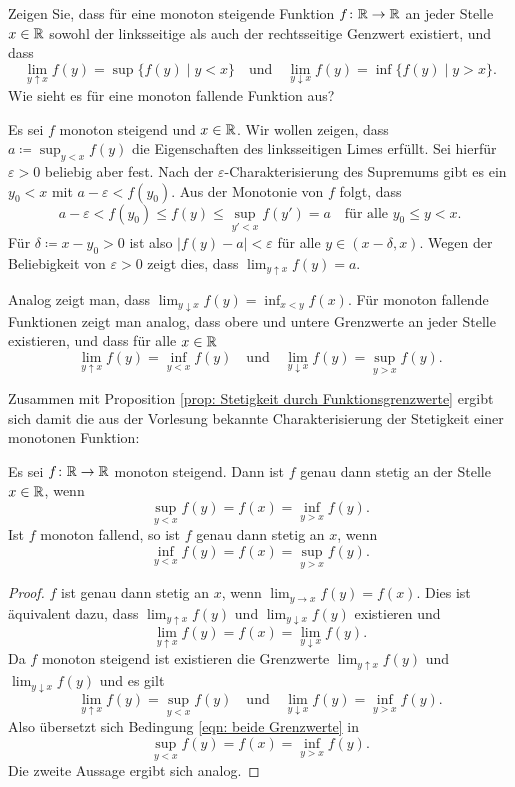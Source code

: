 \documentclass[a4paper,10pt]{article}
\begin{document}
\begin{question}
 Zeigen Sie, dass für eine monoton steigende Funktion $f \colon \mathbb{R} \to \mathbb{R}$ an jeder Stelle $x \in \mathbb{R}$ sowohl der linksseitige als auch der rechtsseitige Genzwert existiert, und dass
 \[
  \lim_{y \uparrow x} f(y) = \sup\{f(y) \mid y < x\}
  \quad
  \text{und}
  \quad
  \lim_{y \downarrow x} f(y) = \inf\{f(y) \mid y > x\}.
 \]
 Wie sieht es für eine monoton fallende Funktion aus?
\end{question}
\begin{solution}
 Es sei $f$ monoton steigend und $x \in \mathbb{R}$. Wir wollen zeigen, dass $a \coloneqq \sup_{y < x} f(y)$ die Eigenschaften des linksseitigen Limes erfüllt. Sei hierfür $\varepsilon > 0$ beliebig aber fest. Nach der $\varepsilon$-Charakterisierung des Supremums gibt es ein $y_0 < x$ mit $a-\varepsilon < f(y_0)$. Aus der Monotonie von $f$ folgt, dass
 \[
  a-\varepsilon < f(y_0) \leq f(y) \leq \sup_{y' < x} f(y') = a \quad \text{für alle $y_0 \leq y < x$}.
 \]
 Für $\delta \coloneqq x-y_0 > 0$ ist also $|f(y)-a| < \varepsilon$ für alle $y \in (x-\delta, x)$. Wegen der Beliebigkeit von $\varepsilon>0$ zeigt dies, dass $\lim_{y \uparrow x} f(y) = a$.
 
 Analog zeigt man, dass $\lim_{y \downarrow x} f(y) = \inf_{x < y} f(x)$. Für monoton fallende Funktionen zeigt man analog, dass obere und untere Grenzwerte an jeder Stelle existieren, und dass für alle $x \in \mathbb{R}$
 \[
  \lim_{y \uparrow x} f(y) = \inf_{y < x} f(y)
  \quad
  \text{und}
  \quad
  \lim_{y \downarrow x} f(y) = \sup_{y > x} f(y).
 \]
\end{solution}


Zusammen mit Proposition \ref{prop: Stetigkeit durch Funktionsgrenzwerte} ergibt sich damit die aus der Vorlesung bekannte Charakterisierung der Stetigkeit einer monotonen Funktion:


\begin{kor}
 Es sei $f \colon \mathbb{R} \to \mathbb{R}$ monoton steigend. Dann ist $f$ genau dann stetig an der Stelle $x \in \mathbb{R}$, wenn
 \[
  \sup_{y < x} f(y) = f(x) = \inf_{y > x} f(y).
 \]
 Ist $f$ monoton fallend, so ist $f$ genau dann stetig an $x$, wenn
 \[
  \inf_{y < x} f(y) = f(x) = \sup_{y > x} f(y).
 \]
\end{kor}
\begin{proof}
 $f$ ist genau dann stetig an $x$, wenn $\lim_{y \to x} f(y) = f(x)$. Dies ist äquivalent dazu, dass $\lim_{y \uparrow x} f(y)$ und $\lim_{y \downarrow x} f(y)$ existieren und
 \begin{equation}\label{eqn: beide Grenzwerte}
  \lim_{y \uparrow x} f(y) = f(x) = \lim_{y \downarrow x} f(y).
 \end{equation}
 Da $f$ monoton steigend ist existieren die Grenzwerte $\lim_{y \uparrow x} f(y)$ und $\lim_{y \downarrow x} f(y)$ und es gilt
 \[
  \lim_{y \uparrow x} f(y) = \sup_{y < x} f(y)
  \quad
  \text{und}
  \quad
  \lim_{y \downarrow x} f(y) = \inf_{y > x} f(y).
 \]
 Also übersetzt sich Bedingung \eqref{eqn: beide Grenzwerte} in
 \[
  \sup_{y < x} f(y) = f(x) = \inf_{y > x} f(y).
 \]
 Die zweite Aussage ergibt sich analog.
\end{proof}
\end{document}
